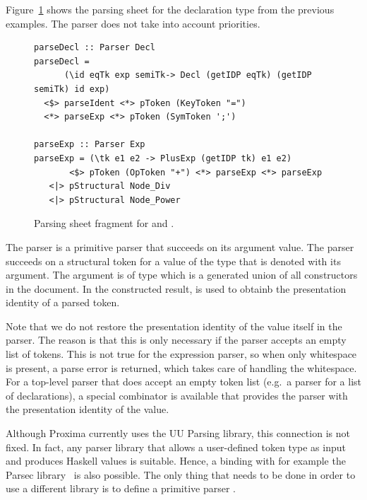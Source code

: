 \documentclass[12pt]{article}
\begin{document}
Figure~\ref{fig:parser} shows the parsing sheet for the declaration type from the previous examples. The parser does not take into account priorities.

\begin{figure}
\begin{center}
\begin{footnotesize}
\begin{verbatim}
parseDecl :: Parser Decl
parseDecl = 
      (\id eqTk exp semiTk-> Decl (getIDP eqTk) (getIDP semiTk) id exp)
  <$> parseIdent <*> pToken (KeyToken "=") 
  <*> parseExp <*> pToken (SymToken ';')
       
parseExp :: Parser Exp
parseExp = (\tk e1 e2 -> PlusExp (getIDP tk) e1 e2)
       <$> pToken (OpToken "+") <*> parseExp <*> parseExp
   <|> pStructural Node_Div
   <|> pStructural Node_Power
\end{verbatim}
\end{footnotesize}
\end{center}
\caption{Parsing sheet fragment for  and .} \label{fig:parser} 
\end{figure}

The  parser is a primitive parser that succeeds on its argument  value. The  parser succeeds on a structural token for a value of the type that is denoted with its argument. The argument is of type  which is a generated union of all constructors in the document. In the constructed result,  is used to obtainb the presentation identity of a parsed token. 

Note that we do not restore the presentation identity of the  value itself in the  parser. The reason is that this is only necessary if the parser accepts an empty list of tokens. This is not true for the expression parser, so when only whitespace is present, a parse error is returned, which takes care of handling the whitespace. For a top-level parser that does accept an empty token list (e.g.\ a parser for a list of declarations), a special combinator is available that provides the parser with the presentation identity of the  value.

Although Proxima currently uses the UU Parsing library, this connection is not fixed. In fact, any  parser library that allows a user-defined token type as input and produces Haskell values is suitable. Hence, a binding with for example the Parsec library~\cite{leijen08parsec} is also possible. The only thing that needs to be done in order to use a different library is to define a primitive parser .
\end{document}
